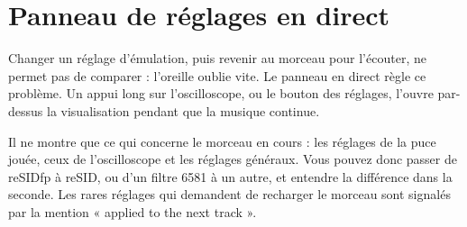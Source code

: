 \chapter{Panneau de réglages en direct}
Changer un réglage d'émulation, puis revenir au morceau pour l'écouter, ne permet pas de comparer : l'oreille oublie
vite. Le panneau en direct règle ce problème. Un appui long sur l'oscilloscope, ou le bouton des réglages, l'ouvre
par-dessus la visualisation pendant que la musique continue.

Il ne montre que ce qui concerne le morceau en cours : les réglages de la puce jouée, ceux de l'oscilloscope et les
réglages généraux. Vous pouvez donc passer de reSIDfp à reSID, ou d'un filtre 6581 à un autre, et entendre la
différence dans la seconde. Les rares réglages qui demandent de recharger le morceau sont signalés par la mention
« applied to the next track ».
